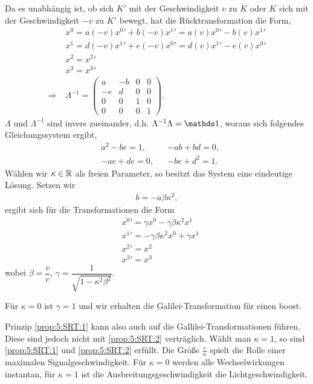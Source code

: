 Da es unabhängig ist, ob sich $K'$ mit der Geschwindigkeit $v$ zu $K$ oder $K$
sich mit der Geschwindigkeit $-v$ zu $K'$ bewegt, hat die Rücktransformation
die Form,
\begin{align*}
&x^0 = a(-v){x^0}' + b(-v){x^1}' = a(v){x^0}' - b(v){x^1}'\\
&x^1 = d(-v){x^1}' + e(-v){x^0}' = d(v){x^1}' - e(v){x^0}'\\
&x^2 = {x^2}'\\
&x^3 = {x^3}'\\
\Rightarrow\;&\Lambda^{-1} =
\begin{pmatrix}
a & -b & 0 & 0\\
-e & d & 0 & 0\\
0 & 0 & 1 & 0\\
0 & 0 & 0 & 1
\end{pmatrix}.
\end{align*}
$\Lambda$ und $\Lambda^{-1}$ sind invers zueinander, d.h.
$\Lambda^{-1} \Lambda = \Id$,
woraus sich folgendes Gleichungssystem ergibt,
\begin{align*}
&a^2 -be = 1, && -ab + bd = 0,\\
&-ae + de = 0, && -be +d^2 = 1.
\end{align*}
Wählen wir $\kappa\in\mathbb{R}$ als freien Parameter, so besitzt das System eine
eindeutige Lösung. Setzen wir
\begin{align*}
b = -a\beta \kappa^2,
\end{align*}
ergibt sich für die Transformationen die Form
\begin{align*}
&{x^0}' = \gamma x^0 - \gamma\beta\kappa^2x^1\\
&{x^1}' = -\gamma\beta\kappa^2 x^0 + \gamma x^1\\
&{x^2}' = x^2\\
&{x^3}' = x^3
\end{align*}
wobei $\beta = \dfrac{v}{c}$, $\gamma=\dfrac{1}{\sqrt{1-\kappa^2\beta^2}}$.
\begin{bemn}
Für $\kappa = 0$ ist $\gamma=1$ und wir erhalten die
Galilei-Transformation für einen boost.

Prinzip \ref{prop:5:SRT:1} kann also auch auf die Gallilei-Transformationen
führen. Diese sind jedoch nicht mit \ref{prop:5:SRT:2} verträglich. Wählt man
$\kappa = 1$, so sind \ref{prop:5:SRT:1} und \ref{prop:5:SRT:2} erfüllt. Die
Größe $\frac{c}{\kappa}$ spielt die Rolle einer maximalen
Signalgeschwindigkeit. Für $\kappa=0$ werden alle Wechselwirkungen instantan,
für $\kappa=1$ ist die Ausbreitungsgeschwindigkeit die
Lichtgeschwindigkeit.\maphere
\end{bemn}

